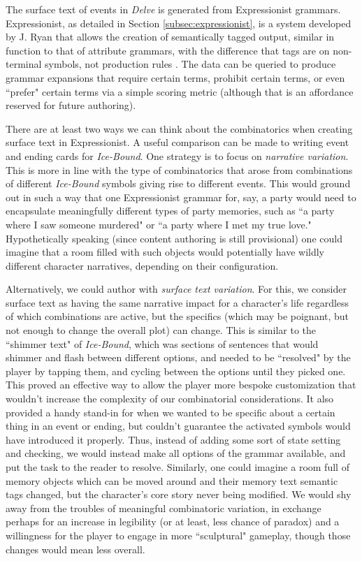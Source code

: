 The surface text of events in \textit{Delve} is generated from Expressionist grammars. Expressionist, as detailed in Section \ref{subsec:expressionist}, is a system developed by J. Ryan that allows the creation of semantically tagged output, similar in function to that of attribute grammars, with the difference that tags are on non-terminal symbols, not production rules \cite{ryan2016expressionist}. The data can be queried to produce grammar expansions that require certain terms, prohibit certain terms, or even ``prefer" certain terms via a simple scoring metric (although that is an affordance reserved for future authoring).

There are at least two ways we can think about the combinatorics when creating surface text in Expressionist. A useful comparison can be made to writing event and ending cards for \textit{Ice-Bound}. One strategy is to focus on \textit{narrative variation}. This is more in line with the type of combinatorics that arose from combinations of different \textit{Ice-Bound} symbols giving rise to different events. This would ground out in such a way that one Expressionist grammar for, say, a party would need to encapsulate meaningfully different types of party memories, such as ``a party where I saw someone murdered" or ``a party where I met my true love." Hypothetically speaking (since content authoring is still provisional) one could imagine that a room filled with such objects would potentially have wildly different character narratives, depending on their configuration.

Alternatively, we could author with \textit{surface text variation}. For this, we consider surface text as having the same narrative impact for a character's life regardless of which combinations are active, but the specifics (which may be poignant, but not enough to change the overall plot) can change. This is similar to the ``shimmer text" of \textit{Ice-Bound}, which was sections of sentences that would shimmer and flash between different options, and needed to be ``resolved" by the player by tapping them, and cycling between the options until they picked one. This proved an effective way to allow the player more bespoke customization that wouldn't increase the complexity of our combinatorial considerations. It also provided a handy stand-in for when we wanted to be specific about a certain thing in an event or ending, but couldn't guarantee the activated symbols would have introduced it properly. Thus, instead of adding some sort of state setting and checking, we would instead make all options of the grammar available, and put the task to the reader to resolve. Similarly, one could imagine a room full of memory objects which can be moved around and their memory text semantic tags changed, but the character’s core story never being modified. We would shy away from the troubles of meaningful combinatoric variation, in exchange perhaps for an increase in legibility (or at least, less chance of paradox) and a willingness for the player to engage in more ``sculptural" gameplay, though those changes would mean less overall.

